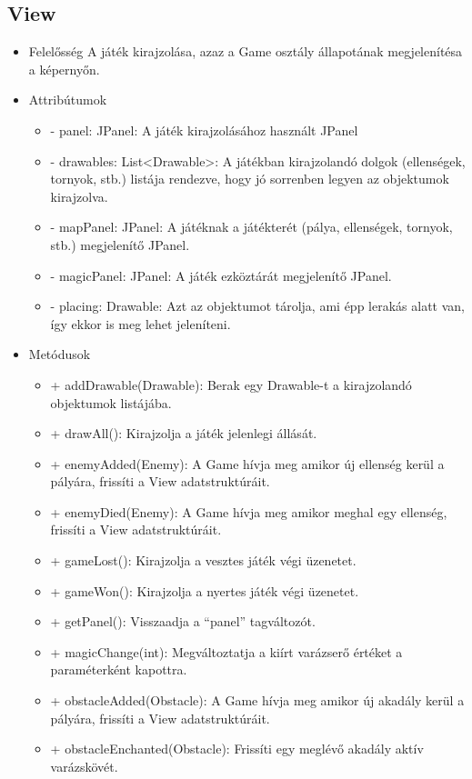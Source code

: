 \subsection{View}
\begin{itemize}
\item Felelősség \newline
A játék kirajzolása, azaz a Game osztály állapotának megjelenítésa a képernyőn.
\item Attribútumok
	\begin{itemize}
		\item - panel: JPanel: A játék kirajzolásához használt JPanel
		\item - drawables: List<Drawable>: A játékban kirajzolandó dolgok (ellenségek, tornyok, stb.) listája rendezve, hogy jó sorrenben legyen az objektumok kirajzolva.
		\item - mapPanel: JPanel: A játéknak a játékterét (pálya, ellenségek, tornyok, stb.) megjelenítő JPanel.
		\item - magicPanel: JPanel: A játék ezköztárát megjelenítő JPanel.
		\item - placing: Drawable: Azt az objektumot tárolja, ami épp lerakás alatt van, így ekkor is meg lehet jeleníteni.
	\end{itemize}
\item Metódusok
	\begin{itemize}
		\item + addDrawable(Drawable): Berak egy Drawable-t a kirajzolandó objektumok listájába.
		\item + drawAll(): Kirajzolja a játék jelenlegi állását.
		\item + enemyAdded(Enemy): A Game hívja meg amikor új ellenség kerül a pályára, frissíti a View adatstruktúráit.
		\item + enemyDied(Enemy): A Game hívja meg amikor meghal egy ellenség, frissíti a View adatstruktúráit.
		\item + gameLost(): Kirajzolja a vesztes játék végi üzenetet.
		\item + gameWon(): Kirajzolja a nyertes játék végi üzenetet.
		\item + getPanel(): Visszaadja a ``panel'' tagváltozót.
		\item + magicChange(int): Megváltoztatja a kiírt varázserő értéket a paraméterként kapottra.
		\item + obstacleAdded(Obstacle): A Game hívja meg amikor új akadály kerül a pályára, frissíti a View adatstruktúráit.
		\item + obstacleEnchanted(Obstacle): Frissíti egy meglévő akadály aktív varázskövét.

\end{itemize}
\end{itemize}
